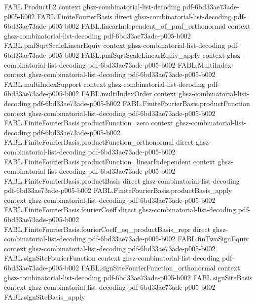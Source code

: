 \begin{theorem}
\proofstep
  {FABL.ProductL2}
  {context}
  {ghsz-combinatorial-list-decoding}
  {pdf-6bd33ae73ade-p005-b002}
\proofstep
  {FABL.FiniteFourierBasis}
  {direct}
  {ghsz-combinatorial-list-decoding}
  {pdf-6bd33ae73ade-p005-b002}
\proofstep
  {FABL.linearIndependent_of_pmf_orthonormal}
  {context}
  {ghsz-combinatorial-list-decoding}
  {pdf-6bd33ae73ade-p005-b002}
\proofstep
  {FABL.pmfSqrtScaleLinearEquiv}
  {context}
  {ghsz-combinatorial-list-decoding}
  {pdf-6bd33ae73ade-p005-b002}
\proofstep
  {FABL.pmfSqrtScaleLinearEquiv_apply}
  {context}
  {ghsz-combinatorial-list-decoding}
  {pdf-6bd33ae73ade-p005-b002}
\proofstep
  {FABL.MultiIndex}
  {context}
  {ghsz-combinatorial-list-decoding}
  {pdf-6bd33ae73ade-p005-b002}
\proofstep
  {FABL.multiIndexSupport}
  {context}
  {ghsz-combinatorial-list-decoding}
  {pdf-6bd33ae73ade-p005-b002}
\proofstep
  {FABL.multiIndexOrder}
  {context}
  {ghsz-combinatorial-list-decoding}
  {pdf-6bd33ae73ade-p005-b002}
\proofstep
  {FABL.FiniteFourierBasis.productFunction}
  {context}
  {ghsz-combinatorial-list-decoding}
  {pdf-6bd33ae73ade-p005-b002}
\proofstep
  {FABL.FiniteFourierBasis.productFunction_zero}
  {context}
  {ghsz-combinatorial-list-decoding}
  {pdf-6bd33ae73ade-p005-b002}
\proofstep
  {FABL.FiniteFourierBasis.productFunction_orthonormal}
  {direct}
  {ghsz-combinatorial-list-decoding}
  {pdf-6bd33ae73ade-p005-b002}
\proofstep
  {FABL.FiniteFourierBasis.productFunction_linearIndependent}
  {context}
  {ghsz-combinatorial-list-decoding}
  {pdf-6bd33ae73ade-p005-b002}
\proofstep
  {FABL.FiniteFourierBasis.productBasis}
  {direct}
  {ghsz-combinatorial-list-decoding}
  {pdf-6bd33ae73ade-p005-b002}
\proofstep
  {FABL.FiniteFourierBasis.productBasis_apply}
  {context}
  {ghsz-combinatorial-list-decoding}
  {pdf-6bd33ae73ade-p005-b002}
\proofstep
  {FABL.FiniteFourierBasis.fourierCoeff}
  {direct}
  {ghsz-combinatorial-list-decoding}
  {pdf-6bd33ae73ade-p005-b002}
\proofstep
  {FABL.FiniteFourierBasis.fourierCoeff_eq_productBasis_repr}
  {direct}
  {ghsz-combinatorial-list-decoding}
  {pdf-6bd33ae73ade-p005-b002}
\proofstep
  {FABL.finTwoSignEquiv}
  {context}
  {ghsz-combinatorial-list-decoding}
  {pdf-6bd33ae73ade-p005-b002}
\proofstep
  {FABL.signSiteFourierFunction}
  {context}
  {ghsz-combinatorial-list-decoding}
  {pdf-6bd33ae73ade-p005-b002}
\proofstep
  {FABL.signSiteFourierFunction_orthonormal}
  {context}
  {ghsz-combinatorial-list-decoding}
  {pdf-6bd33ae73ade-p005-b002}
\proofstep
  {FABL.signSiteBasis}
  {context}
  {ghsz-combinatorial-list-decoding}
  {pdf-6bd33ae73ade-p005-b002}
\proofstep
  {FABL.signSiteBasis_apply}

\end{theorem}

